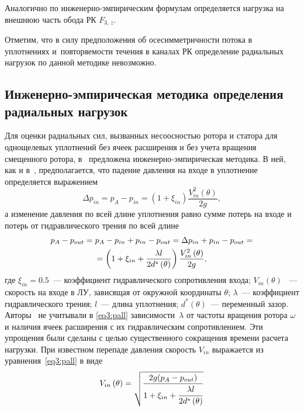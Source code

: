 Аналогично по инженерно-эмпирическим формулам определяется нагрузка на внешнюю часть обода РК $F_{3,\,z}$.

Отметим, что в силу предположения об осесимметричности потока в уплотнениях и~повторяемости
течения в каналах РК определение радиальных нагрузок по данной методике невозможно.

\subsection{Инженерно-эмпирическая методика определения радиальных нагрузок}
\label{s:322}
Для оценки радиальных сил, вызванных несоосностью ротора и статора для однощелевых уплотнений без ячеек 
расширения и без учета вращения смещенного ротора, в~\cite{lomakin} предложена инженерно-эмпирическая методика.
 В ней, как и в~\cite{idelchik}, предполагается, что падение давления на входе в уплотнение определяется 
выражением
\begin{equation}
  \Delta p_{in} = p_A -p_{in}  = \left( {1 + \xi _{in} } \right)\frac{{V_{in}^2 \left( \theta  \right)}}{{2g}},
  \label{eq3:pin}
\end{equation}
а изменение давления по всей длине уплотнения равно сумме потерь на входе и потерь 
от гидравлического трения по всей длине
\begin{gather}
  p_A  - p_{out}  = p_A  - p_{in}  + p_{in}  - p_{out}  =  \Delta p_{in}  + p_{in}  - p_{out}  = \notag \\
  = \left( 1 + \xi _{in}  + \frac{\lambda l}{2d^* \left(\theta \right)} \right)
  \frac{{V_{in}^2 \left( \theta  \right)}}{{2g}},
  \label{eq3:pall}
\end{gather}
где $\xi_{in}=0.5$~--- коэффициент гидравлического сопротивления входа; $V_{in}(\theta)$ ~--- скорость на 
входе в ЛУ, зависящая от окружной координаты $\theta$; $\lambda$~--- коэффициент гидравлического трения; 
$l$~--- длина уплотнения; $d^* \left(\theta \right)$~--- переменный зазор. Авторы~\cite{lomakin} не учитывали 
в \eqref{eq3:pall} зависимости~$\lambda$ от частоты вращения ротора $\omega$ и наличия ячеек расширения с их 
гидравлическим сопротивлением. Эти упрощения были сделаны с целью существенного сокращения времени расчета 
нагрузки. При известном перепаде давления скорость $V_{in}$ выражается из уравнения~\eqref{eq3:pall} в виде
\begin{equation*}
  V_{in}\left(\theta \right) = \sqrt{\frac{2g (p_A -p_{out})}{1+\xi_{in}+\cfrac{\lambda l}{2d^* 
        \left(\theta \right)}}}
\end{equation*}
